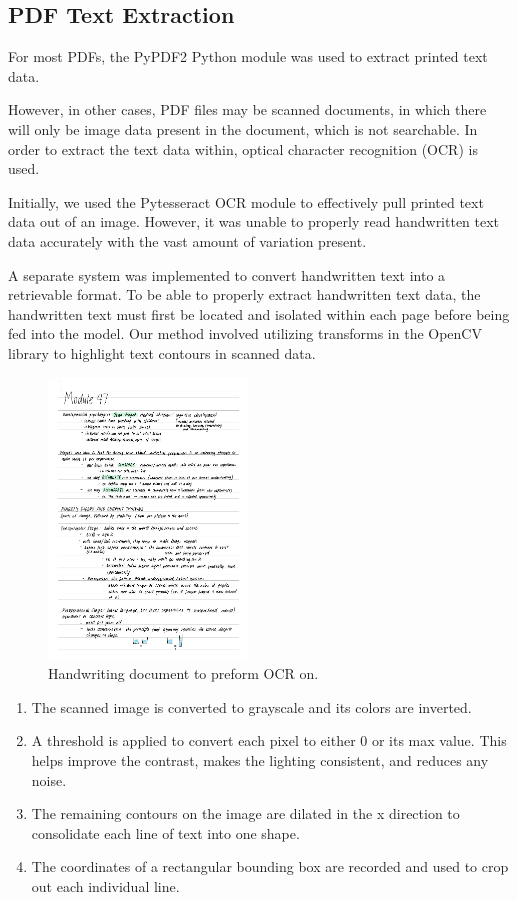 \documentclass[11pt, a4paper, twocolumn]{article}
\begin{document}
\subsection{ PDF Text Extraction} 
For most PDFs, the PyPDF2 Python module was used to extract printed text data. 

However, in other cases, PDF files may be scanned documents, in which there will only be image data present in the document, which is not searchable. In order to extract the text data within, optical character recognition (OCR) is used. 

Initially, we used the Pytesseract OCR module to effectively pull printed text data out of an image. However, it was unable to properly read handwritten text data accurately with the vast amount of variation present.

A separate system was implemented to convert handwritten text into a retrievable format. To be able to properly extract handwritten text data, the handwritten text must first be located and isolated within each page before being fed into the model. Our method involved utilizing transforms in the OpenCV library to highlight text contours in scanned data. 

\begin{figure}[htp]
    \centering
    \includegraphics[width=5.3cm]{5.png}
    \caption{Handwriting document to preform OCR on.}
    \label{fig:cnn}
\end{figure}

\begin{enumerate}
\item  The scanned image is converted to grayscale and its colors are inverted. 
\item  A threshold is applied to convert each pixel to either 0 or its max value. This helps improve the contrast, makes the lighting consistent, and reduces any noise.
\item  The remaining contours on the image are dilated in the x direction to consolidate each line of text into one shape.
\item  The coordinates of a rectangular bounding box are recorded and used to crop out each individual line. 
\end{enumerate}
\end{document}
